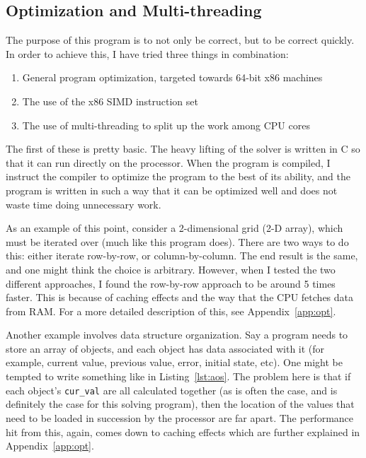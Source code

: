 \subsection{Optimization and Multi-threading}
\label{sec:opt-mul}
The purpose of this program is to not only be correct, but to be correct quickly. In order to achieve this, I have
tried three things in combination:
\begin{enumerate}
\item General program optimization, targeted towards 64-bit x86 machines
\item The use of the x86 SIMD instruction set
\item The use of multi-threading to split up the work among CPU cores
\end{enumerate}
The first of these is pretty basic. The heavy lifting of the solver is written in C so that it can run directly on the
processor. When the program is compiled, I instruct the compiler to optimize the program to the best of its ability,
and the program is written in such a way that it can be optimized well and does not waste time doing unnecessary work.

As an example of this point, consider a 2-dimensional grid (2-D array), which must be iterated over (much like
this program does). There are two ways to do this: either iterate row-by-row, or column-by-column. The end result is
the same, and one might think the choice is arbitrary. However, when I tested the two different approaches, I found
the row-by-row approach to be around 5 times faster. This is because of caching effects and the way that the CPU
fetches data from RAM\cite{intel-1}. For a more detailed description of this, see Appendix~\ref{app:opt}.

Another example involves data structure organization. Say a program needs to store an array of objects, and each object
has data associated with it (for example, current value, previous value, error, initial state, etc). One might be tempted
to write something like in Listing~\ref{lst:aos}. The problem here is that if each object's \texttt{cur\_val} are all
calculated together (as is often the case, and is definitely the case for this solving program), then the location of
the values that need to be loaded in succession by the processor are far apart. The performance hit from this, again, comes down to caching
effects which are further explained in Appendix~\ref{app:opt}.

\vspace{5mm}

